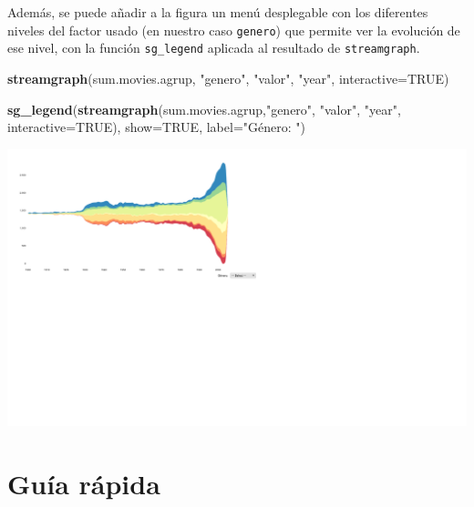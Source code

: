 \documentclass[
]{book}
\newenvironment{Shaded}{\begin{snugshade}}{\end{snugshade}}
\newcommand{\DataTypeTok}[1]{\textcolor[rgb]{0.13,0.29,0.53}{#1}}
\newcommand{\KeywordTok}[1]{\textcolor[rgb]{0.13,0.29,0.53}{\textbf{#1}}}
\newcommand{\NormalTok}[1]{#1}
\newcommand{\OtherTok}[1]{\textcolor[rgb]{0.56,0.35,0.01}{#1}}
\newcommand{\StringTok}[1]{\textcolor[rgb]{0.31,0.60,0.02}{#1}}
\theoremstyle{definition}
\theoremstyle{definition}
\theoremstyle{definition}
\theoremstyle{remark}
\begin{document}
Además, se puede añadir a la figura un menú desplegable con los diferentes niveles del factor usado (en nuestro caso \texttt{genero}) que permite ver la evolución de ese nivel, con la función \texttt{sg\_legend} aplicada al resultado de \texttt{streamgraph}.

\begin{Shaded}
\begin{Highlighting}[]
\KeywordTok{streamgraph}\NormalTok{(sum.movies.agrup, }\StringTok{"genero"}\NormalTok{, }\StringTok{"valor"}\NormalTok{, }\StringTok{"year"}\NormalTok{,}
   \DataTypeTok{interactive=}\OtherTok{TRUE}\NormalTok{)}
\end{Highlighting}
\end{Shaded}

\begin{Shaded}
\begin{Highlighting}[]
\KeywordTok{sg\_legend}\NormalTok{(}\KeywordTok{streamgraph}\NormalTok{(sum.movies.agrup,}\StringTok{"genero"}\NormalTok{, }
   \StringTok{"valor"}\NormalTok{, }\StringTok{"year"}\NormalTok{, }\DataTypeTok{interactive=}\OtherTok{TRUE}\NormalTok{), }\DataTypeTok{show=}\OtherTok{TRUE}\NormalTok{, }
    \DataTypeTok{label=}\StringTok{"Género: "}\NormalTok{)}
\end{Highlighting}
\end{Shaded}

\begin{center}\includegraphics[width=0.9\linewidth]{14cap13_EDextra_files/figure-latex/unnamed-chunk-48-1} \end{center}

\hypertarget{guuxeda-ruxe1pida-4}{%
\section{Guía rápida}\label{guuxeda-ruxe1pida-4}}
\end{document}
